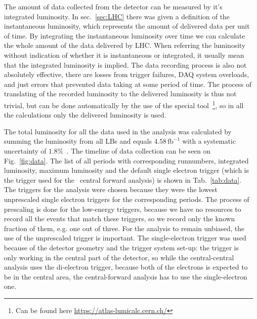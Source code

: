 The amount of data collected from the detector can be measured by it's integrated luminosity. In sec.~\ref{sec:LHC} there was given a definition of the instantaneous luminosity, which represents the amount of delivered data per unit of time. By integrating the instantaneous luminosity over time we can calculate the whole amount of the data delivered by LHC. When referring the luminosity without indication of whether it is instantaneous or integrated, it usually mean that the integrated luminosity is implied. The data recording process is also not absolutely effective, there are losses from trigger failures, DAQ system overloads, and just errors that prevented data taking at some period of time. The process of translating of the recorded luminosity to the delivered luminosity is thus not trivial, but can be done automatically by the use of the special tool~\footnote{Can be found here \url{https://atlas-lumicalc.cern.ch/}}, so in all the calculations only the delivered luminosity is used.

The total luminosity for all the data used in the analysis was calculated by summing the luminosity from all LBs and equals \ensuremath{4.58\,\mathrm{fb}^{-1}} with a systematic uncertainty of $1.8\%$~\cite{lib:lumi}. The timeline of data collection can be seen on Fig.~\ref{fig:data}. The list of all periods with corresponding runnumbers, integrated luminosity, maximum luminosity and the default single electron trigger (which is the trigger used for the \Zee\ central forward analysis) is shown in Tab.~\ref{tab:data}. The triggers for the analysis were chosen because they were the lowest unprescaled single electron triggers for the corresponding periods. The process of prescaling is done for the low-energy triggers, because we have no resources to record all the events that match these triggers, so we record only the known fraction of them, e.g. one out of three. For the analysis to remain unbiased, the use of the unprescaled trigger is important. The single-electron trigger was used because of the detector geometry and the trigger system set-up: the trigger is only working in the central part of the detector, so while the central-central analysis uses the di-electron trigger, because both of the electrons is expected to be in the central area, the central-forward analysis has to use the single-electron one.

